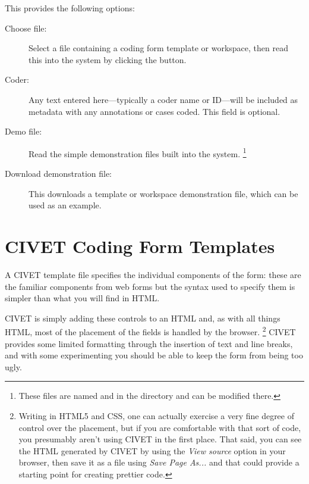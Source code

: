 \documentclass[letterpaper,10pt,english]{sphinxmanual}
\begin{document}
This provides the following options:
\begin{description}
\item[{Choose file:}] \leavevmode
Select a file containing a coding form template or workspace, then
read this into the system by clicking the  button.

\item[{Coder:}] \leavevmode
Any text entered here—typically a coder name or ID—will be included
as metadata with any annotations or cases coded. This field is
optional.

\item[{Demo file:}] \leavevmode
Read the simple demonstration files built into the system. \footnote{
These files are named  and
 in the directory
 and can be modified
there.
}

\item[{Download demonstration file:}] \leavevmode
This downloads a template or workspace demonstration file, which can
be used as an example.

\end{description}


\chapter{CIVET Coding Form Templates}
\label{forms:sec-forms}\label{forms:civet-coding-form-templates}\label{forms::doc}
A CIVET template file specifies the individual components of the form:
these are the familiar components from web forms but the syntax used to
specify them is simpler than what you will find in HTML.

CIVET is simply adding these controls to an HTML  and, as with
all things HTML, most of the placement of the fields is handled by the
browser. \footnote{
Writing in HTML5 and CSS, one can actually exercise a very fine
degree of control over the placement, but if you are comfortable with
that sort of code, you presumably aren’t using CIVET in the first
place. That said, you can see the HTML generated by CIVET by using
the \emph{View source} option in your browser, then save it as a file
using \emph{Save Page As...} and that could provide a starting point for
creating prettier code.
} CIVET provides some limited formatting through the
insertion of text and line breaks, and with some experimenting you
should be able to keep the form from being too ugly.
\end{document}
